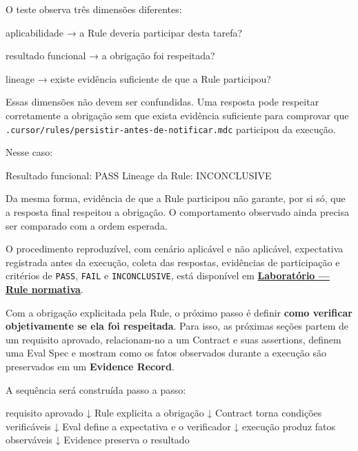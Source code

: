 \documentclass[
  10pt,
  a4paper,
  oneside]{book}
\newenvironment{Shaded}{}{}
\newcommand{\NormalTok}[1]{#1}
\renewenvironment{Shaded}{\begin{snugshade}}{\end{snugshade}}%
\begin{document}
O teste observa três dimensões diferentes:

\begin{Shaded}
\begin{Highlighting}[]
\NormalTok{aplicabilidade}
\NormalTok{→ a Rule deveria participar desta tarefa?}

\NormalTok{resultado funcional}
\NormalTok{→ a obrigação foi respeitada?}

\NormalTok{lineage}
\NormalTok{→ existe evidência suficiente de que a Rule participou?}
\end{Highlighting}
\end{Shaded}

Essas dimensões não devem ser confundidas. Uma resposta pode respeitar
corretamente a obrigação sem que exista evidência suficiente para
comprovar que \texttt{.cursor/rules/persistir-antes-de-notificar.mdc}
participou da execução.

Nesse caso:

\begin{Shaded}
\begin{Highlighting}[]
\NormalTok{Resultado funcional: PASS}
\NormalTok{Lineage da Rule: INCONCLUSIVE}
\end{Highlighting}
\end{Shaded}

Da mesma forma, evidência de que a Rule participou não garante, por si
só, que a resposta final respeitou a obrigação. O comportamento
observado ainda precisa ser comparado com a ordem esperada.

O procedimento reproduzível, com cenário aplicável e não aplicável,
expectativa registrada antes da execução, coleta das respostas,
evidências de participação e critérios de \texttt{PASS}, \texttt{FAIL} e
\texttt{INCONCLUSIVE}, está disponível em
\textbf{\protect\hyperlink{laboratorio-rule-normativa}{Laboratório ---
Rule normativa}}.

Com a obrigação explicitada pela Rule, o próximo passo é definir
\textbf{como verificar objetivamente se ela foi respeitada}. Para isso,
as próximas seções partem de um requisito aprovado, relacionam-no a um
Contract e suas assertions, definem uma Eval Spec e mostram como os
fatos observados durante a execução são preservados em um
\textbf{Evidence Record}.

A sequência será construída passo a passo:

\begin{Shaded}
\begin{Highlighting}[]
\NormalTok{requisito aprovado}
\NormalTok{        ↓}
\NormalTok{Rule explicita a obrigação}
\NormalTok{        ↓}
\NormalTok{Contract torna condições verificáveis}
\NormalTok{        ↓}
\NormalTok{Eval define a expectativa e o verificador}
\NormalTok{        ↓}
\NormalTok{execução produz fatos observáveis}
\NormalTok{        ↓}
\NormalTok{Evidence preserva o resultado}
\end{Highlighting}
\end{Shaded}
\end{document}

